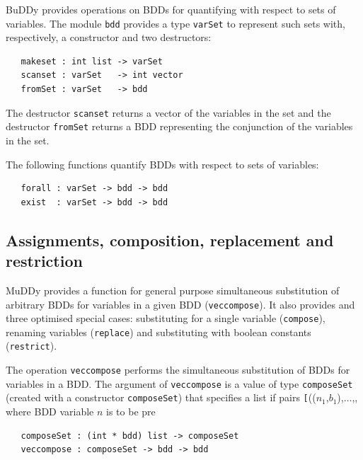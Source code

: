\documentclass[12pt,fleqn]{article}
\renewcommand{\t}[1]{\mbox{\tt #1}}
\newcommand{\Buddy}{BuDDy{}}
\newcommand{\Muddy}{MuDDy{}}
\begin{document}
\Buddy{} provides operations on BDDs for quantifying with respect to sets
of variables. The module  \t{bdd} provides a type \t{varSet} to represent such
sets with, respectively, a constructor and two destructors:

\begin{verbatim}
   makeset : int list -> varSet
   scanset : varSet   -> int vector
   fromSet : varSet   -> bdd
\end{verbatim}

The destructor \t{scanset} returns a vector of the variables in the
set and the destructor \t{fromSet} returns a BDD representing the
conjunction of the variables in the set.

The following functions quantify BDDs with respect to sets of variables:

\begin{verbatim}
   forall : varSet -> bdd -> bdd
   exist  : varSet -> bdd -> bdd
\end{verbatim}

\subsection{Assignments, composition, replacement and restriction}\label{replace}

\Muddy{} provides a function for general purpose simultaneous
substitution of arbitrary BDDs for variables in a given BDD (\t{veccompose}). It also
provides and three optimised special cases: substituting for a single
variable (\t{compose}), renaming variables (\t{replace}) and
substituting with boolean constants (\t{restrict}).

The operation \t{veccompose} performs the simultaneous substitution
of BDDs for variables in a BDD. The argument of \t{veccompose}
is a value of type \t{composeSet}
(created with a constructor \t{composeSet})
that specifies a list if pairs \t[(($n_1$,$b_1$),$\ldots$,, where BDD variable $n$ is to be pre

\begin{verbatim}
   composeSet : (int * bdd) list -> composeSet
   veccompose : composeSet -> bdd -> bdd
\end{verbatim}
\end{document}
